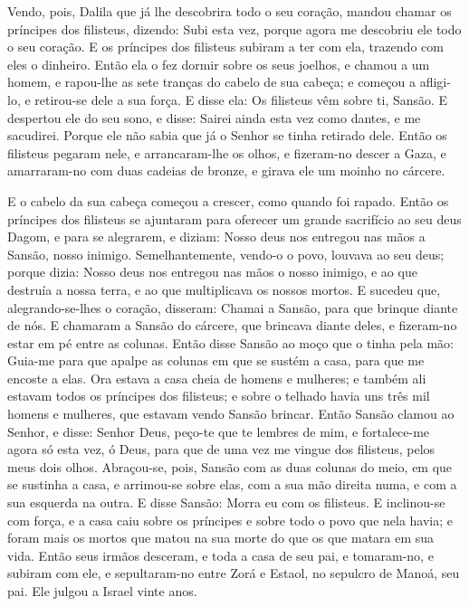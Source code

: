 Vendo, pois, Dalila que já lhe descobrira todo o seu coração,
mandou chamar os príncipes dos filisteus, dizendo: Subi esta vez,
porque agora me descobriu ele todo o seu coração. E os príncipes dos
filisteus subiram a ter com ela, trazendo com eles o dinheiro.
Então ela o fez dormir sobre os seus joelhos, e chamou a um
homem, e rapou-lhe as sete tranças do cabelo de sua cabeça; e
começou a afligi-lo, e retirou-se dele a sua força. E disse
ela: Os filisteus vêm sobre ti, Sansão. E despertou ele do seu sono,
e disse: Sairei ainda esta vez como dantes, e me sacudirei. Porque
ele não sabia que já o Senhor se tinha retirado dele. Então
os filisteus pegaram nele, e arrancaram-lhe os olhos, e fizeram-no
descer a Gaza, e amarraram-no com duas cadeias de bronze, e girava
ele um moinho no cárcere.

E o cabelo da sua cabeça começou a crescer, como quando foi
rapado. Então os príncipes dos filisteus se ajuntaram para
oferecer um grande sacrifício ao seu deus Dagom, e para se
alegrarem, e diziam: Nosso deus nos entregou nas mãos a Sansão,
nosso inimigo. Semelhantemente, vendo-o o povo, louvava ao
seu deus; porque dizia: Nosso deus nos entregou nas mãos o nosso
inimigo, e ao que destruía a nossa terra, e ao que multiplicava os
nossos mortos. E sucedeu que, alegrando-se-lhes o coração,
disseram: Chamai a Sansão, para que brinque diante de nós. E
chamaram a Sansão do cárcere, que brincava diante deles, e
fizeram-no estar em pé entre as colunas. Então disse Sansão
ao moço que o tinha pela mão: Guia-me para que apalpe as colunas em
que se sustém a casa, para que me encoste a elas. Ora estava
a casa cheia de homens e mulheres; e também ali estavam todos os
príncipes dos filisteus; e sobre o telhado havia uns três mil homens
e mulheres, que estavam vendo Sansão brincar. Então Sansão
clamou ao Senhor, e disse: Senhor Deus, peço-te que te lembres de
mim, e fortalece-me agora só esta vez, ó Deus, para que de uma vez
me vingue dos filisteus, pelos meus dois olhos. Abraçou-se,
pois, Sansão com as duas colunas do meio, em que se sustinha a casa,
e arrimou-se sobre elas, com a sua mão direita numa, e com a sua
esquerda na outra. E disse Sansão: Morra eu com os filisteus.
E inclinou-se com força, e a casa caiu sobre os príncipes e sobre
todo o povo que nela havia; e foram mais os mortos que matou na sua
morte do que os que matara em sua vida. Então seus irmãos
desceram, e toda a casa de seu pai, e tomaram-no, e subiram com ele,
e sepultaram-no entre Zorá e Estaol, no sepulcro de Manoá, seu pai.
Ele julgou a Israel vinte anos.

